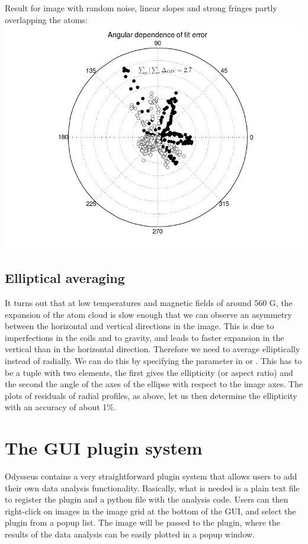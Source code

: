 \documentclass[letterpaper,10pt,english]{manual}
\begin{document}
Result for image with random noise, linear slopes and strong fringes partly overlapping the atoms:
\includegraphics[width=400pt]{raderror_allkindsofnoise.png}

\subsection{Elliptical averaging}

It turns out that at low temperatures and magnetic fields of around 560 G, the expansion of the atom cloud is slow enough that we can observe an asymmetry between the horizontal and vertical directions in the image. This is due to imperfections in the coils and to gravity, and leads to faster expansion in the vertical than in the horizontal direction. Therefore we need to average elliptically instead of radially. We can do this by specifying the  parameter in  or . This has to be a tuple with two elements, the first gives the ellipticity (or aspect ratio) and the second the angle of the axes of the ellipse with respect to the image axes. The plots of residuals of radial profiles, as above, let us then determine the ellipticity with an accuracy of about 1\%.

\resetcurrentobjects
\hypertarget{--doc-plugins}{}

\hypertarget{writing-plugins}{}\section{The GUI plugin system}

Odysseus contains a very straightforward plugin system that allows users to add
their own data analysis functionality. Basically, what is needed is a plain text
file to register the plugin and a python file with the analysis code.
Users can then right-click on images in the image grid at the bottom of the GUI,
and select the plugin from a popup list. The image will be passed to the plugin,
where the results of the data analysis can be easily plotted in a popup window.
\end{document}
